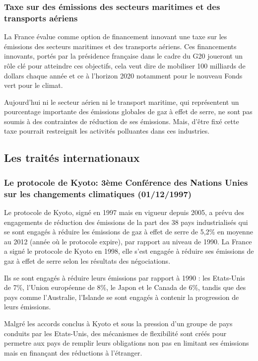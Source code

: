 \documentclass[a4paper,10pt]{article}
\begin{document}
\subsubsection{Taxe sur des émissions des secteurs maritimes et des transports aériens}

La France évalue comme option de financement innovant une taxe sur les émissions
des secteurs  maritimes et des  transports aériens. Ces  financements innovants,
portés par  la présidence française  dans le cadre  du G20 joueront un  rôle clé
pour  atteindre ces  objectifs, cela  veut dire  de mobiliser  100  milliards de
dollars chaque année et ce à l’horizon 2020 notamment pour le nouveau Fonds vert
pour le climat.


Aujourd'hui ni le  secteur aérien ni le transport  maritime, qui représentent un
pourcentage importante des  émissions globales de gaz à effet  de serre, ne sont
pas soumis  à des contraintes de  réduction de ses émissions.  Mais, d’être fixé
cette taxe pourrait restreignit les activités polluantes dans ces industries.


\subsection{Les traités internationaux}

\subsubsection[Le protocole de Kyoto]{Le protocole de Kyoto: 3ème Conférence des Nations Unies sur les changements climatiques  (01/12/1997)}

Le protocole de  Kyoto, signé en 1997  mais en vigueur depuis 2005,  a prévu des
engagements de réduction des émissions de la part des 38 pays industrialisés qui
se sont  engagés à réduire  les émissions de  gaz à effet  de serre de  5,2\% en
moyenne  au 2012  (année  où le  protocole  expire), par  rapport  au niveau  de
1990. La  France a signé  le protocole  de Kyoto en  1998, elle s’est  engagée à
réduire  ses  émissions  de  gaz  à  effet de  serre  selon  les  résultats  des
négociations.


Ils  se  sont engagés  à  réduire  leurs émissions  par  rapport  à  1990 :  les
Etats-Unis de  7\%, l’Union  européenne de 8\%,  le Japon  et le Canada  de 6\%,
tandis que des  pays comme l’Australie, l’Islande se sont  engagés à contenir la
progression de leurs émissions.


Malgré  les accords conclus  à Kyoto  et sous  la pression  d'un groupe  de pays
conduits  par les  Etats-Unis, des  mécanismes  de flexibilité  sont créés  pour
permetre aux pays de remplir leurs obligations non pas en limitant ses émissions
mais en finançant des réductions à l'étranger. 
\end{document}
